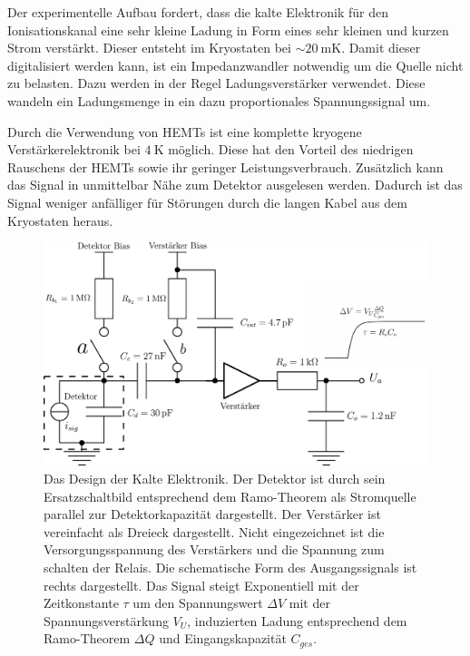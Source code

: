 Der experimentelle Aufbau fordert, dass die kalte Elektronik für den Ionisationskanal eine sehr kleine Ladung in Form eines sehr kleinen und kurzen Strom verstärkt.
Dieser entsteht im Kryostaten bei $\sim\SI{20}{\milli\kelvin}$.
Damit dieser digitalisiert werden kann, ist ein Impedanzwandler notwendig um die Quelle nicht zu belasten.
Dazu werden in der Regel Ladungsverstärker verwendet\cite{Censier2012}.
Diese wandeln ein Ladungsmenge in ein dazu proportionales Spannungssignal um.

Durch die Verwendung von HEMTs ist eine komplette kryogene Verstärkerelektronik bei $\SI{4}{\kelvin}$ möglich.
Diese hat den Vorteil des niedrigen Rauschens der HEMTs sowie ihr geringer Leistungsverbrauch.
Zusätzlich kann das Signal in unmittelbar Nähe zum Detektor ausgelesen werden.
Dadurch ist das Signal weniger anfälliger für Störungen durch die langen Kabel aus dem Kryostaten heraus.

\begin{figure}[!t]
\begin{center}
\includegraphics[width=\textwidth]{./fig/Ausleseelektronik.pdf}
\vspace{-0.5cm}
\caption{Das Design der Kalte Elektronik.
Der Detektor ist durch sein Ersatzschaltbild entsprechend dem Ramo-Theorem als Stromquelle parallel zur Detektorkapazität dargestellt.
Der Verstärker ist vereinfacht als Dreieck dargestellt.
Nicht eingezeichnet ist die Versorgungsspannung des Verstärkers und die Spannung zum schalten der Relais.
Die schematische Form des Ausgangssignals ist rechts dargestellt.
Das Signal steigt Exponentiell mit der Zeitkonstante $\tau$ um den Spannungswert $\Delta V$ mit der Spannungsverstärkung $V_U$, induzierten Ladung entsprechend dem Ramo-Theorem $\Delta Q$ und Eingangskapazität $C_{ges}$.}
\label{fig:Ausleseelektronik}
\end{center}
\end{figure}

